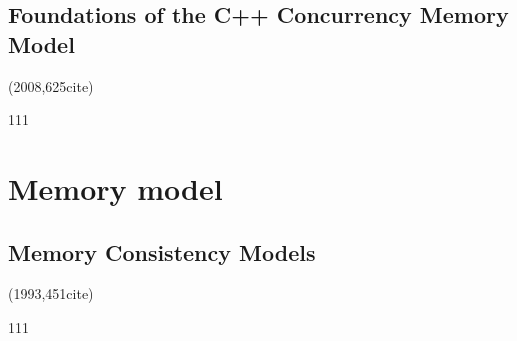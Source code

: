 \documentclass[a4paper,twoside]{scrbook}
\begin{document}
\subsection{Foundations of the C++ Concurrency Memory Model\cite{boehm2008foundations}}
(2008,625cite)\par
111
\section{Memory model}
\subsection{Memory Consistency Models\cite{mosberger1993memory}}
(1993,451cite)\par
111

\renewcommand{\bibname}{Reference}


\end{document}
